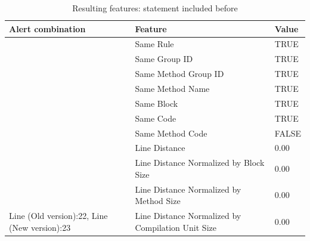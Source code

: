 \documentclass[
]{article}
\begin{document}
\begin{table}[!h]

\caption{\label{tab:unnamed-chunk-12}Resulting features: statement included before \label{include_statement_before} }
\centering
\begin{tabular}[t]{l|l|l}
\hline
Alert combination & Feature & Value\\
\hline
\rowcolor{gray!6}   & Same Rule & TRUE\\

 & Same Group ID & TRUE\\

\rowcolor{gray!6}   & Same Method Group ID & TRUE\\

 & Same Method Name & TRUE\\

\rowcolor{gray!6}   & Same Block & TRUE\\

 & Same Code & TRUE\\

\rowcolor{gray!6}   & Same Method Code & FALSE\\

 & Line Distance & 0.00\\

\rowcolor{gray!6}   & Line Distance Normalized by Block Size & 0.00\\

 & Line Distance Normalized by Method Size & 0.00\\

\multirow[t]{-11}{*}{\raggedright\arraybackslash Line (Old version):22, Line (New version):23} & Line Distance Normalized by Compilation Unit Size & 0.00\\
\hline
\end{tabular}
\end{table}

\normalsize

\newpage
\end{document}
